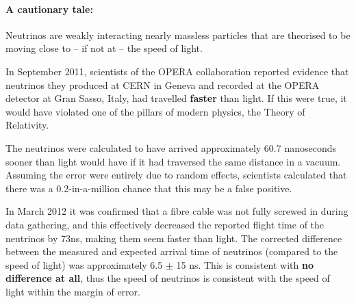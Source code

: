 \begin{tip}
\paragraph{A cautionary tale:} Neutrinos are weakly interacting nearly massless particles that are theorised to be moving close to -- if not at -- the speed of light.

In September 2011, scientists of the OPERA collaboration reported evidence that neutrinos they produced at CERN in Geneva and recorded at the OPERA detector at Gran Sasso, Italy, had travelled \textbf{faster} than light. If this were true, it would have violated one of the pillars of modern physics, the Theory of Relativity.

The neutrinos were calculated to have arrived approximately 60.7 nanoseconds sooner than light would have if it had traversed the same distance in a vacuum. Assuming the error were entirely due to random effects, scientists calculated that there was a 0.2-in-a-million chance that this may be a false positive.

In March 2012 it was confirmed that a fibre cable was not fully screwed in during data gathering, and this effectively decreased the reported flight time of the neutrinos by 73ns, making them seem faster than light. The corrected difference between the measured and expected arrival time of neutrinos (compared to the speed of light) was approximately 6.5 $\pm$ 15 ns. This is consistent with \textbf{no difference at all}, thus the speed of neutrinos is consistent with the speed of light within the margin of error.
\end{tip}




